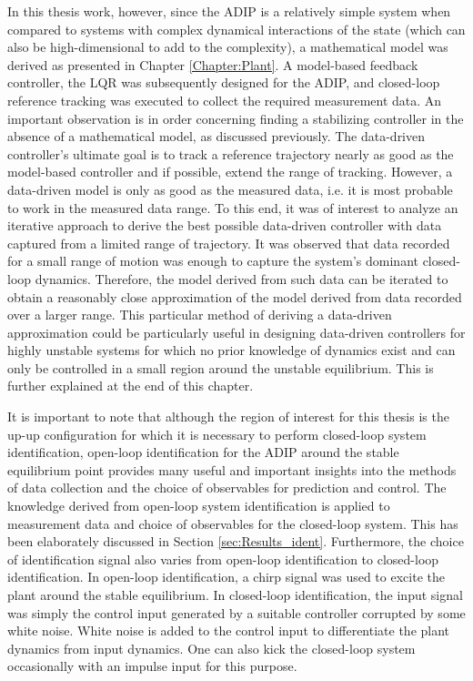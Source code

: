 In this thesis work, however, since the ADIP is a relatively simple system when compared to systems with complex dynamical interactions of the state (which can also be high-dimensional to add to the complexity), a mathematical model was derived as presented in Chapter \ref{Chapter:Plant}. A model-based feedback controller, the LQR was subsequently designed for the ADIP, and closed-loop reference tracking was executed to collect the required measurement data. An important observation is in order concerning finding a stabilizing controller in the absence of a mathematical model, as discussed previously. The data-driven controller's ultimate goal is to track a reference trajectory nearly as good as the model-based controller and if possible, extend the range of tracking. However, a data-driven model is only as good as the measured data, i.e. it is most probable to work in the measured data range. To this end, it was of interest to analyze an iterative approach to derive the best possible data-driven controller with data captured from a limited range of trajectory. It was observed that data recorded for a small range of motion was enough to capture the system's dominant closed-loop dynamics. Therefore, the model derived from such data can be iterated to obtain a reasonably close approximation of the model derived from data recorded over a larger range. This particular method of deriving a data-driven approximation could be particularly useful in designing data-driven controllers for highly unstable systems for which no prior knowledge of dynamics exist and can only be controlled in a small region around the unstable equilibrium. This is further explained at the end of this chapter. \par
It is important to note that although the region of interest for this thesis is the up-up configuration for which it is necessary to perform closed-loop system identification, open-loop identification for the ADIP around the stable equilibrium point provides many useful and important insights into the methods of data collection and the choice of observables for prediction and control. The knowledge derived from open-loop system identification is applied to measurement data and choice of observables for the closed-loop system. This has been elaborately discussed in Section \ref{sec:Results_ident}. Furthermore, the choice of identification signal also varies from open-loop identification to closed-loop identification. In open-loop identification, a chirp signal was used to excite the plant around the stable equilibrium. In closed-loop identification, the input signal was simply the control input generated by a suitable controller corrupted by some white noise. White noise is added to the control input to differentiate the plant dynamics from input dynamics. One can also kick the closed-loop system occasionally with an impulse input for this purpose.\par
